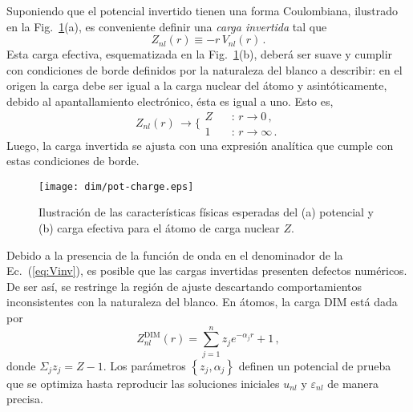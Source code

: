 Suponiendo que el potencial invertido tienen una forma Coulombiana, 
ilustrado en la Fig.~\ref{fig:potycharge}(a), es conveniente definir una 
\textit{carga invertida} tal que
\begin{equation}
Z_{nl}(r) \equiv -r \, V_{nl}(r) \,.
\label{eq:Zinv}
\end{equation}
Esta carga efectiva, esquematizada en la Fig.~\ref{fig:potycharge}(b), 
deberá ser suave y cumplir con condiciones de borde definidos por la 
naturaleza del blanco a describir: en el origen la carga debe 
ser igual a la carga nuclear del átomo y asintóticamente, debido al 
apantallamiento electrónico, ésta es igual a uno. Esto es,
\begin{equation}
Z_{nl}(r) \, \rightarrow 
\bigg\{ 
\begin{array}{ll}
Z  \ \  & \ \ \text{:\ \ }r  \rightarrow 0 \,, \\ 
1           & \ \ \text{:\ \ }r  \rightarrow \infty \,.
\end{array}
\label{eq:Zasympt}
\end{equation} 
Luego, la carga invertida se ajusta con una expresión analítica que 
cumple con estas condiciones de borde.

\begin{figure}[t]
\centering
\texttt{[image: dim/pot-charge.eps]}
\caption[Características físicas del potencial y carga efectiva.]
{Ilustración de las características físicas esperadas del (a) potencial 
y (b) carga efectiva para el átomo de carga nuclear $Z$.}
\label{fig:potycharge}
\end{figure}

Debido a la presencia de la función de onda en 
el denominador de la Ec.~(\ref{eq:Vinv}), es posible que las cargas 
invertidas presenten defectos numéricos. De ser así, se restringe la 
región de ajuste descartando comportamientos inconsistentes con la 
naturaleza del blanco. En átomos, la carga DIM está dada por
\begin{equation}
Z_{nl}^{\mathrm{DIM}}(r)= \sum_{j=1}^{n} z_j e^{-\alpha_j r}+1 \,,
\label{eq:atomzDIM}
\end{equation}
donde $\Sigma_j z_j=Z-1$. Los parámetros $\left\{z_j,\alpha_j\right\}$ 
definen un potencial de prueba que se optimiza hasta reproducir las 
soluciones iniciales $u_{nl}$ y $\varepsilon_{nl}$ de manera precisa. 

